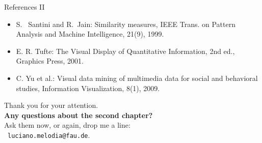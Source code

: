 \documentclass[aspectratio=169,t]{beamer}
\begin{document}
  { 
    \begin{frame}{References II}
        \begin{itemize}
          \item S.  Santini and R. Jain: Similarity measures, IEEE Trans. on Pattern Analysis and Machine Intelligence, 21(9), 1999.
          \item E. R. Tufte: The Visual Display of Quantitative Information, 2nd ed., Graphics Press, 2001.
          \item C. Yu et al.: Visual data mining of multimedia data for social and behavioral studies, Information Visualization, 8(1), 2009.
        \end{itemize}
    \end{frame}
  }

  { %
    \begin{frame}[c]
      \begin{center}
        Thank you for your attention.\\
        {\bf Any questions about the second chapter?}\\[0.5cm]
        Ask them now, or again, drop me a line: \\ 
        \faSendO \ \texttt{luciano.melodia@fau.de}.
      \end{center}
    \end{frame}
  }
\end{document}
